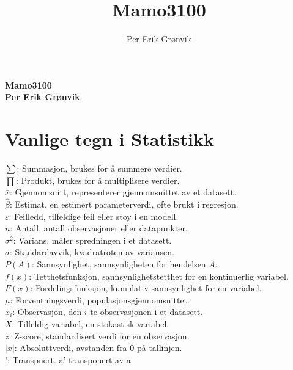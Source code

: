 \documentclass[a4paper,11pt]{article}
\title{Mamo3100}
\author{Per Erik Grønvik} %
\date{}   %
\begin{document}
\vspace{-0.5cm} %

\begin{footnotesize}

\begin{multicols}{2}
\paragraph{\large Mamo3100 \\ \tiny Per Erik Grønvik }


\section*{Vanlige tegn i Statistikk}

\(\sum\): Summasjon, brukes for å summere verdier.\\
\(\prod\): Produkt, brukes for å multiplisere verdier.\\
\(\bar{x}\): Gjennomsnitt, representerer gjennomsnittet av et datasett.\\
\(\hat{\beta}\): Estimat, en estimert parameterverdi, ofte brukt i regresjon.\\
\(\varepsilon\): Feilledd, tilfeldige feil eller støy i en modell.\\
\(n\): Antall, antall observasjoner eller datapunkter.\\
\(\sigma^2\): Varians, måler spredningen i et datasett.\\
\(\sigma\): Standardavvik, kvadratroten av variansen.\\
\(P(A)\): Sannsynlighet, sannsynligheten for hendelsen \(A\).\\
\(f(x)\): Tetthetsfunksjon, sannsynlighetstetthet for en kontinuerlig variabel.\\
\(F(x)\): Fordelingsfunksjon, kumulativ sannsynlighet for en variabel.\\
\(\mu\): Forventningsverdi, populasjonsgjennomsnittet.\\
\(x_i\): Observasjon, den \(i\)-te observasjonen i et datasett.\\
\(X\): Tilfeldig variabel, en stokastisk variabel.\\
\(z\): Z-score, standardisert verdi for en observasjon.\\
\(|x|\): Absoluttverdi, avstanden fra 0 på tallinjen.\\
': Transpnert. a' transponert av a


\end{multicols}
\end{footnotesize}
\end{document}
